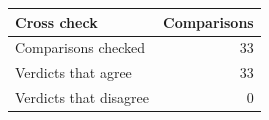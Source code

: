 \begingroup\small\setlength{\tabcolsep}{4pt}
\begin{tabular}{lr}
\toprule
\textbf{Cross check} & \textbf{Comparisons} \\
\midrule
Comparisons checked & 33 \\  %
Verdicts that agree & 33 \\  %
Verdicts that disagree & 0 \\  %
\bottomrule
\end{tabular}
\endgroup
\par\smallskip{}
